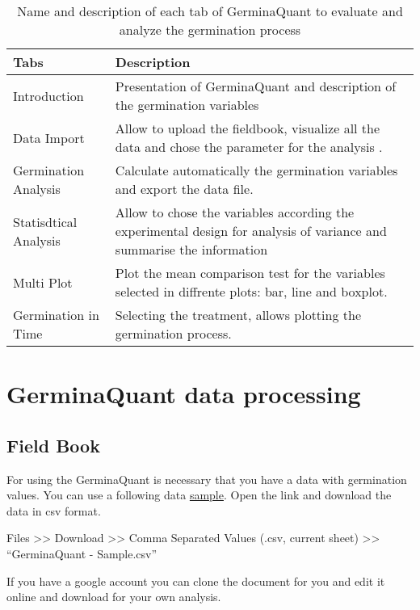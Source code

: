 \documentclass[]{book}
\begin{document}
\begin{table}

\caption{\label{tab:tabs}Name and description of each tab of GerminaQuant to evaluate and analyze the germination process}
\centering
\begin{tabular}[t]{ll}
\toprule
Tabs & Description\\
\midrule
Introduction & Presentation of GerminaQuant and description of the germination variables\\
Data Import & Allow to upload the fieldbook, visualize all the data and chose the parameter for the analysis .\\
Germination Analysis & Calculate automatically the germination variables and export the data file.\\
Statisdtical Analysis & Allow to chose the variables according the experimental design for analysis of variance and summarise the information\\
Multi Plot & Plot the mean comparison test for the variables selected in diffrente plots: bar, line and boxplot.\\
Germination in Time & Selecting the treatment, allows plotting the germination process.\\
\bottomrule
\end{tabular}
\end{table}

\chapter{GerminaQuant data
processing}\label{germinaquant-data-processing}

\section{Field Book}\label{field-book}

For using the GerminaQuant is necessary that you have a data with
germination values. You can use a following data
\href{https://docs.google.com/spreadsheets/d/1QziIXGOwb8cl3GaARJq6Ez6aU7vND_UHKJnFcAKx0VI/edit\#gid=667855537}{sample}.
Open the link and download the data in csv format.

Files \textgreater{}\textgreater{} Download \textgreater{}\textgreater{}
Comma Separated Values (.csv, current sheet)
\textgreater{}\textgreater{} ``GerminaQuant - Sample.csv''

If you have a google account you can clone the document for you and edit
it online and download for your own analysis.
\end{document}
